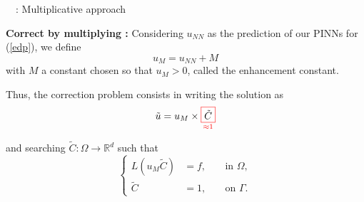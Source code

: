 \begin{frame}{\appendixname~\theappendixframenumber~: Multiplicative approach}
	\vspace{-5pt}
	
	\textbf{Correct by multiplying :} Considering $u_{NN}$ as the prediction of our PINNs for (\ref{edp}), we define
	\begin{equation*}
		u_M = u_{NN}+M
	\end{equation*}
	with $M$ a constant chosen so that $u_M>0$, called the enhancement constant.
	
	Thus, the correction problem consists in writing the solution as
	\begin{equation*}
		\tilde{u}=u_M\times\underset{\textcolor{red}{\approx 1}}{\fcolorbox{red}{white}{$\tilde{C}$}}
	\end{equation*}
	
	\begin{minipage}{\linewidth}
		and searching $\tilde{C}: \Omega \rightarrow \mathbb{R}^d$ such that
		\begin{equation*}
			\left\{\begin{aligned}
				L(u_M\tilde{C})&=f, \; &&\text{in } \Omega, \\
				\tilde{C}&=1, \; &&\text{on } \Gamma.
			\end{aligned}\right. \label{corr_add}
		\end{equation*}
	\end{minipage}
\end{frame}
\addtocounter{appendixframenumber}{1}

%

%
